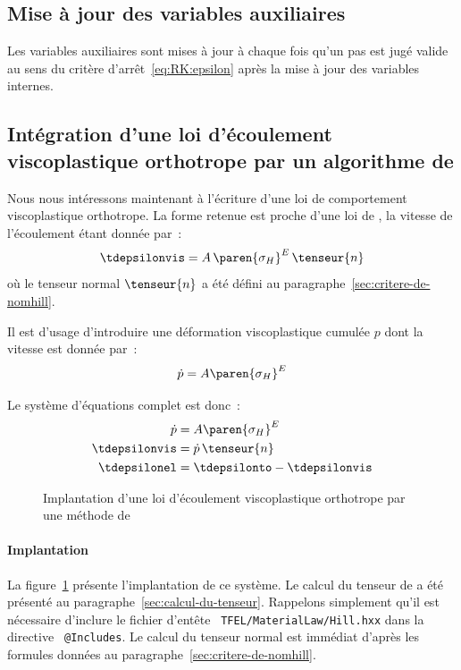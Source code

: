 \documentclass[rectoverso,pleiades,pstricks,leqno,anti]{texmf/note_technique_2010}
\newcommand{\sigmaH}{\ensuremath{\sigma_{H}}}
\newcommand{\code}[1]{
  \psframebox[linecolor=ceaorange,shadow=true,blur=true]{
    \begin{minipage}[htbp]{1.0\linewidth}
      \ttfamily\scriptsize #1
    \end{minipage}
  }
}
\begin{document}
\subsection{Mise à jour des variables auxiliaires}

Les variables auxiliaires sont mises à jour à chaque fois qu'un pas est
jugé valide au sens du critère d'arrêt~\eqref{eq:RK:epsilon} après la
mise à jour des variables internes.

\subsection{Intégration d'une loi d'écoulement viscoplastique
  orthotrope par un algorithme de }

Nous nous intéressons maintenant à l'écriture d'une loi de
comportement viscoplastique orthotrope. La forme retenue est proche
d'une loi de , la vitesse de l'écoulement étant donnée
par~:
\[
\tdepsilonvis = A\,\paren{\sigmaH}^{E}\,\tenseur{n}
\]
où le tenseur normal \(\tenseur{n}\) a été défini au
paragraphe~\ref{sec:critere-de-nomhill}.

Il est d'usage d'introduire une déformation viscoplastique cumulée
\(p\) dont la vitesse est donnée par~:
\[
\dot{p} = A\paren{\sigmaH}^{E}
\]

Le système d'équations complet est donc~:
\begin{equation}
  \label{eq:law}
  \begin{aligned}
    \dot{p}       &= A\paren{\sigmaH}^{E} \\
    \tdepsilonvis &= \dot{p}\,\tenseur{n}   \\
    \tdepsilonel  &= \tdepsilonto - \tdepsilonvis
  \end{aligned}
\end{equation}

\begin{figure}[htbp]
  \centering
  \begin{minipage}[htbp]{0.9\linewidth}
    \shorthandoff{:}
    \code{
      \small
      
    }
    \shorthandon{:}
  \end{minipage}
  \caption{Implantation d'une loi d'écoulement viscoplastique
    orthotrope par une mé\-tho\-de de }
  \label{fig:OrthoViscoRK}
\end{figure}

\paragraph{Implantation} La figure~\ref{fig:OrthoViscoRK} présente
l'implantation de ce système. Le calcul du tenseur de  a été
présenté au paragraphe~\ref{sec:calcul-du-tenseur}. Rappelons
simplement qu'il est nécessaire d'inclure le fichier d'entête {\tt
  TFEL/\-Material\-Law/\-Hill.hxx} dans la directive {\tt
  @Includes}. Le calcul du tenseur normal est immédiat d'après les
formules données au paragraphe~\ref{sec:critere-de-nomhill}.
\end{document}
